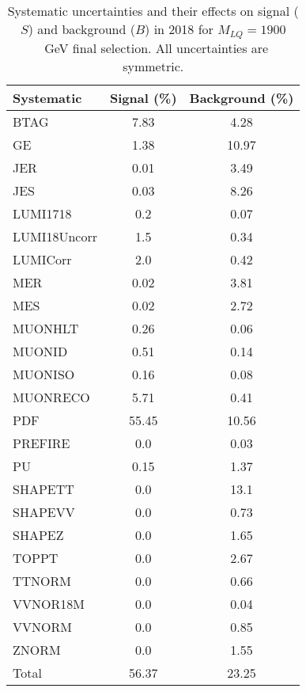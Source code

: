 \begin{table}[htbp]
\begin{center}
\caption{Systematic uncertainties and their effects on signal ($S$) and background ($B$) in 2018 for $M_{LQ}=1900$~GeV final selection. All uncertainties are symmetric.}
\begin{tabular}{lcc}
\hline\hline
Systematic & Signal (\%) & Background (\%) \\ \hline 
BTAG & 7.83 & 4.28\\ 
GE & 1.38 & 10.97\\ 
JER & 0.01 & 3.49\\ 
JES & 0.03 & 8.26\\ 
LUMI1718 & 0.2 & 0.07\\ 
LUMI18Uncorr & 1.5 & 0.34\\ 
LUMICorr & 2.0 & 0.42\\ 
MER & 0.02 & 3.81\\ 
MES & 0.02 & 2.72\\ 
MUONHLT & 0.26 & 0.06\\ 
MUONID & 0.51 & 0.14\\ 
MUONISO & 0.16 & 0.08\\ 
MUONRECO & 5.71 & 0.41\\ 
PDF & 55.45 & 10.56\\ 
PREFIRE & 0.0 & 0.03\\ 
PU & 0.15 & 1.37\\ 
SHAPETT & 0.0 & 13.1\\ 
SHAPEVV & 0.0 & 0.73\\ 
SHAPEZ & 0.0 & 1.65\\ 
TOPPT & 0.0 & 2.67\\ 
TTNORM & 0.0 & 0.66\\ 
VVNOR18M & 0.0 & 0.04\\ 
VVNORM & 0.0 & 0.85\\ 
ZNORM & 0.0 & 1.55\\ 
Total & 56.37 & 23.25\\ \hline \hline
\end{tabular}
\label{tab:SysUncertainties_uujj_1900}
\end{center}
\end{table}


